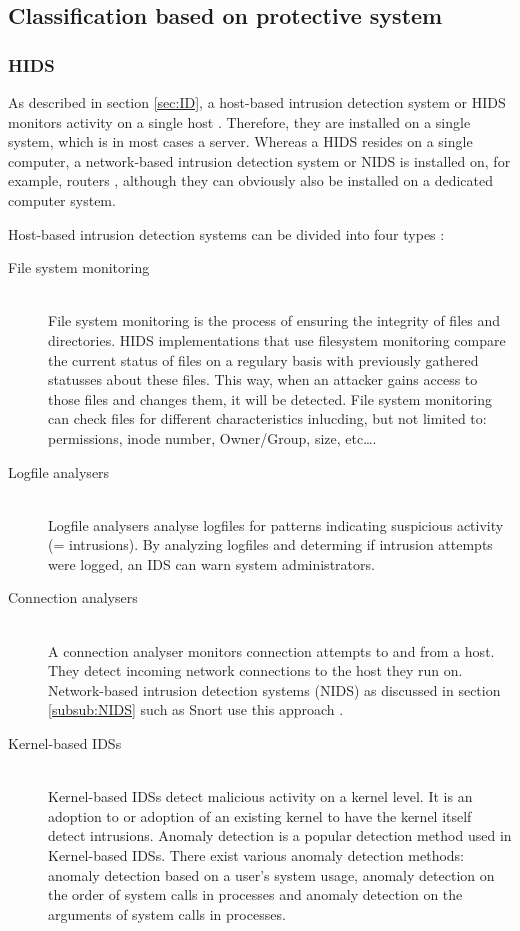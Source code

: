 \subsection{Classification based on protective system}

\subsubsection{HIDS}

As described in section \ref{sec:ID}, a host-based intrusion detection system or HIDS monitors activity on a single host  \citep{Host1}. Therefore, they are installed on a single system, which is in most cases a server. Whereas a HIDS resides on a single computer, a network-based intrusion detection system or NIDS is installed on, for example, routers \citep{windowssecurity2}, although they can obviously also be installed on a dedicated computer system.

Host-based intrusion detection systems can be divided into four types \citep{Report}:
\begin{description}
\item[File system monitoring] \hfill \\
File system monitoring is the process of ensuring the integrity of files and directories. HIDS implementations that use filesystem monitoring compare the current status of files on a regulary basis with previously gathered statusses about these files. This way, when an attacker gains access to those files and changes them, it will be detected. File system monitoring can check files for different characteristics inlucding, but not limited to: permissions, inode number, Owner/Group, size, etc\ldots.
\item[Logfile analysers] \hfill \\
Logfile analysers analyse logfiles for patterns indicating suspicious activity (= intrusions). By analyzing logfiles and determing if intrusion attempts were logged, an IDS can warn system administrators.
\item[Connection analysers] \hfill \\
A connection analyser monitors connection attempts to and from a host. They detect incoming network connections to the host they run on. Network-based intrusion detection systems (NIDS) as discussed in section \ref{subsub:NIDS} such as Snort use this approach \citep{Snort}.
\item[Kernel-based IDSs] \hfill \\
Kernel-based IDSs detect malicious activity on a kernel level. It is an adoption to or adoption of an existing kernel to have the kernel itself detect intrusions. Anomaly detection is a popular detection method used in Kernel-based IDSs. There exist various anomaly detection methods: anomaly detection based on a user's system usage, anomaly detection on the order of system calls in processes and anomaly detection on the arguments of system calls in processes.
\end{description}

